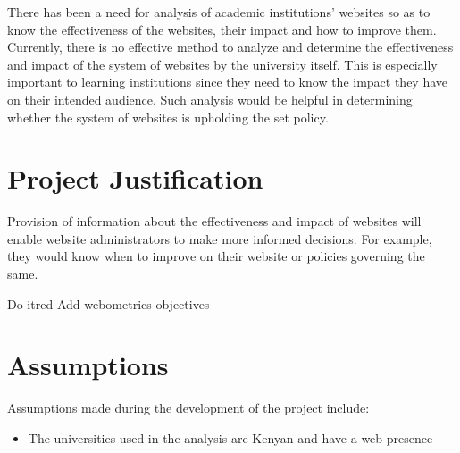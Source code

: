 \noindent
There has been a need for analysis of academic institutions' websites so as to know the effectiveness of the websites, their impact and how to improve them. Currently, there is no effective method to analyze and determine the effectiveness and impact of the system of websites by the university itself. This is especially important to learning institutions since they need to know the impact they have on their intended audience.  Such analysis would be helpful in determining whether the system of websites is upholding the set policy.


\section{Project Justification}
\noindent
Provision of information about the effectiveness and impact of websites will enable website administrators to make more informed decisions. For example, they would know when to improve on their website or policies governing the same.
\begin{review_comment}{Do it}{red}
{Add webometrics objectives}
\end{review_comment}


\section{Assumptions}
Assumptions made during the development of the project include:
\begin{itemize}
\item The universities used in the analysis are Kenyan and have a web presence
\end{itemize}
